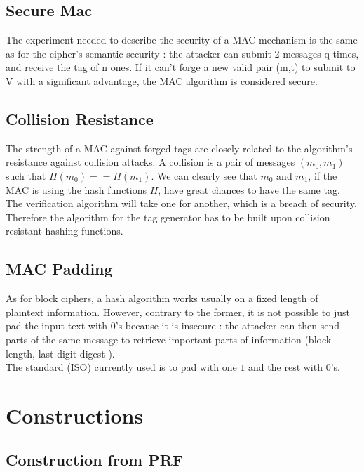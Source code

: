 \subsection{Secure Mac}

The experiment needed to describe the security of a MAC mechanism is the same as for the cipher's semantic security : the attacker can submit 2 messages q times, and receive the tag of n ones. If it can't forge a new valid pair (m,t) to submit to V with a significant advantage, the MAC algorithm is considered secure.

\subsection{Collision Resistance}

The strength of a MAC against forged tags are closely related to the algorithm's resistance against collision attacks. A collision is a pair of messages $(m_0,m_1)$ such that $H(m_0) == H(m_1)$. We can clearly see that $m_0$ and $m_1$, if the MAC is using the hash functions $H$, have great chances to have the same tag. The verification algorithm will take one for another, which is a breach of security. \\
Therefore the algorithm for the tag generator has to be built upon collision resistant hashing functions.


\subsection{MAC Padding}
\label{sec:ISOPadding}

As for block ciphers, a hash algorithm works usually on a fixed length of plaintext information. However, contrary to the former, it is not possible to just pad the input text with 0's because it is insecure : the attacker can then send parts of the same message to retrieve important parts of information (block length, last digit digest ). \\
The standard (ISO) currently used is to pad with one $1$ and the rest with $0$'s.


\section{Constructions}

\subsection{Construction from PRF}

